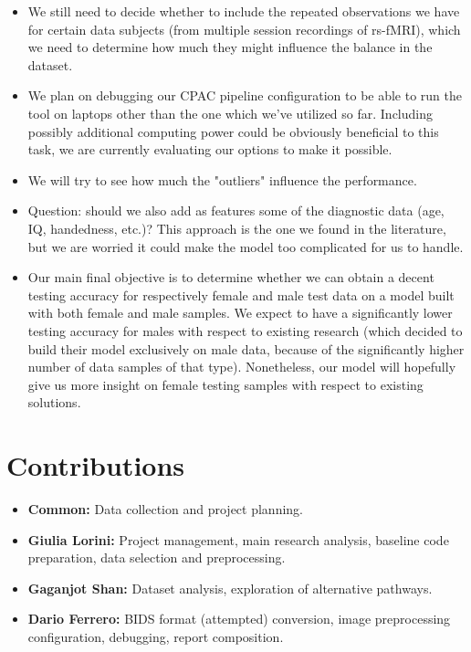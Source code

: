 \documentclass{article}
\begin{document}
\begin{itemize}
	\item We still need to decide whether to include the repeated observations we have for certain data subjects (from multiple session recordings of rs-fMRI), which we need to determine how much they might influence the balance in the dataset.
	\item We plan on debugging our CPAC pipeline configuration to be able to run the tool on laptops other than the one which we've utilized so far. Including possibly additional computing power could be obviously beneficial to this task, we are currently evaluating our options to make it possible.
	\item We will try to see how much the "outliers" influence the performance.
	\item Question: should we also add as features some of the diagnostic data (age, IQ, handedness, etc.)? This approach is the one we found in the literature\cite{guidelinesml}, but we are worried it could make the model too complicated for us to handle.
	\item Our main final objective is to determine whether we can obtain a decent testing accuracy for respectively female and male test data on a model built with both female and male samples. We expect to have a significantly lower testing accuracy for males with respect to existing research (which decided to build their model exclusively on male data\cite{guidelinesml}, because of the significantly higher number of data samples of that type). Nonetheless, our model will hopefully give us more insight on female testing samples with respect to existing solutions.
	
\end{itemize}

\section{Contributions}
\begin{itemize}
	\item \textbf{Common:} Data collection and project planning.
	\item \textbf{Giulia Lorini:} Project management, main research analysis, baseline code preparation, data selection and preprocessing.
	\item \textbf{Gaganjot Shan:} Dataset analysis, exploration of alternative pathways.
	\item \textbf{Dario Ferrero:} BIDS format (attempted) conversion, image preprocessing configuration, debugging, report composition.
\end{itemize}
\cleardoublepage


\cleardoublepage
\end{document}
